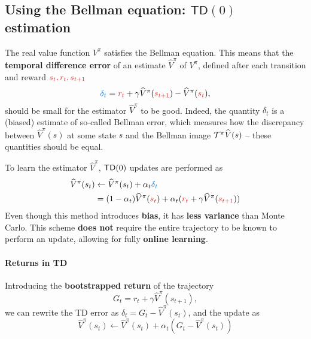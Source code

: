 \documentclass[../course-notes.tex]{subfiles}
\begin{document}
\subsection{\boldmath Using the Bellman equation: $\mathsf{TD}(0)$ estimation}

The real value function $V^\pi$ satisfies the Bellman equation. This means that the \textbf{\bluefont temporal difference error} of an estimate $\widehat{V}^\pi$ of $V^\pi$, defined after each transition and reward ${\redfont s_t,r_t,s_{t+1}}$
\begin{equation}\label{eq:ValueTDerror}
	{\bluefont\delta_t} = {\redfont r_t} + \gamma \widehat{V}^\pi({\redfont s_{t+1}}) - \widehat{V}^\pi({\redfont s_t}),
\end{equation}
should be small for the estimator $\widehat{V}^\pi$ to be good. Indeed, the quantity $\delta_t$ is a (biased) estimate of so-called Bellman error, which measures how the discrepancy between $\widehat{V}^\pi(s)$ at some state $s$ and the Bellman image $\mathcal{T}^\pi \widehat{V}(s)$ -- these quantities should be equal.

To learn the estimator $\widehat{V}^\pi$, $\mathsf{TD}(0)$ updates are performed as
\begin{align*}
	\widehat{V}^\pi(s_t) &\leftarrow
	\widehat{V}^\pi(s_t) + \alpha_t {\bluefont \delta_t} \\
	&= (1 - \alpha_t)\widehat{V}^\pi({\redfont s_t}) + \alpha_t ({\redfont r_t} + \gamma \widehat{V}^\pi({\redfont s_{t+1}}))
\end{align*}
Even though this method introduces \textbf{bias}, it has \textbf{less variance} than Monte Carlo.
This scheme \textbf{does not} require the entire trajectory to be known to perform an update, allowing for fully \textbf{\bluefont online learning}.


\paragraph{Returns in TD} Introducing the \textbf{bootstrapped return} of the trajectory
\[
	G_t = r_t + \gamma\widehat{V}^\pi(s_{t+1}),
\]
we can rewrite the TD error as $\delta_t = G_t - \widehat{V}^\pi(s_t)$, and the update as
\[
	\widehat{V}^\pi(s_t) \leftarrow \widehat{V}^\pi(s_t) + \alpha_t (G_t - \widehat{V}^\pi(s_t))
\]
\end{document}
